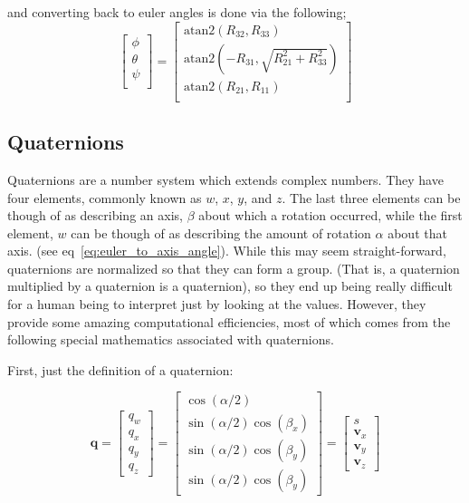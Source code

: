\documentclass[paper=a4, fontsize=11pt]{scrartcl} %
\numberwithin{equation}{section} %
\numberwithin{figure}{section} %
\numberwithin{table}{section} %
\begin{document}
and converting back to euler angles is done via the following;
\begin{equation}
  \begin{bmatrix}
    \phi \\
    \theta \\
    \psi \\
  \end{bmatrix} =
	\begin{bmatrix}
	 \textrm{atan2}\left(R_{32}, R_{33}\right) \\
   \textrm{atan2}\left(-R_{31}, \sqrt{R_{21}^2 + R_{33}^2}\right) \\
   \textrm{atan2}\left(R_{21}, R_{11}\right) \\
  \end{bmatrix}
\end{equation}

\subsection{Quaternions}

Quaternions are a number system which extends complex numbers.  They have four elements, commonly known as $w$, $x$, $y$, and $z$.  The last three elements can be though of as describing an axis, $\beta$ about which a rotation occurred, while the first element, $w$ can be though of as describing the amount of rotation $\alpha$ about that axis. (see eq~\ref{eq:euler_to_axis_angle}). While this may seem straight-forward, quaternions are normalized so that they can form a group.  (That is, a quaternion multiplied by a quaternion is a quaternion), so they end up being really difficult for a human being to interpret just by looking at the values.  However, they provide some amazing computational efficiencies, most of which comes from the following special mathematics associated with quaternions.

First, just the definition of a quaternion:

\begin{equation}
	\bm{q} = \begin{bmatrix}
				q_w \\
				q_x \\
				q_y \\
				q_z
			 \end{bmatrix}
		   = \begin{bmatrix}
				\cos(\alpha/2) \\
				\sin(\alpha/2)\cos(\beta_x) \\
				\sin(\alpha/2)\cos(\beta_y) \\
				\sin(\alpha/2)\cos(\beta_y)
			 \end{bmatrix}
			 = \begin{bmatrix}
			   s \\
			   \bm{v}_x \\
			   \bm{v}_y \\
			   \bm{v}_z
			 \end{bmatrix}
	\label{eq:euler_to_axis_angle}
\end{equation}
\end{document}
